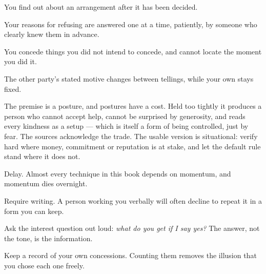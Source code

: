 \begin{feedback}
  \item You find out about an arrangement after it has been decided.
  \item Your reasons for refusing are answered one at a time, patiently, by someone who clearly knew them in advance.
  \item You concede things you did not intend to concede, and cannot locate the moment you did it.
  \item The other party's stated motive changes between tellings, while your own stays fixed.
\end{feedback}

\begin{failure}
The premise is a posture, and postures have a cost. Held too tightly it produces a person who cannot accept help, cannot be surprised by generosity, and reads every kindness as a setup --- which is itself a form of being controlled, just by fear. The sources acknowledge the trade. The usable version is situational: verify hard where money, commitment or reputation is at stake, and let the default rule stand where it does not.
\end{failure}

\begin{countermeasures}
  \item Delay. Almost every technique in this book depends on momentum, and momentum dies overnight.
  \item Require writing. A person working you verbally will often decline to repeat it in a form you can keep.
  \item Ask the interest question out loud: \emph{what do you get if I say yes?} The answer, not the tone, is the information.
  \item Keep a record of your own concessions. Counting them removes the illusion that you chose each one freely.
\end{countermeasures}

\seesources
{}
